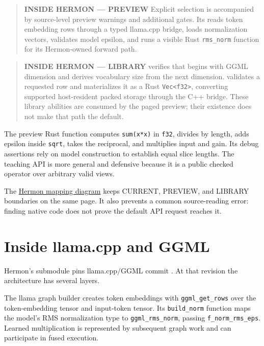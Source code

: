 \begin{quote}
\textbf{INSIDE HERMON --- PREVIEW} Explicit
\texttt{} selection is accompanied
by source-level preview warnings and additional gates. Its
\texttt{} reads token embedding rows through
a typed llama.cpp bridge, loads normalization vectors, validates model
epsilon, and runs a visible Rust \texttt{rms\_norm} function for its
Hermon-owned forward path.
\end{quote}

\begin{quote}
\textbf{INSIDE HERMON --- LIBRARY}
\texttt{} verifies that
\texttt{} begins with GGML dimension
\texttt{} and derives vocabulary size from
the next dimension.
\texttt{} validates a
requested row and materializes it as a Rust
\texttt{Vec\textless{}f32\textgreater{}}, converting supported
host-resident packed storage through the C++ bridge. These library
abilities are consumed by the paged preview; their existence does not
make that path the default.
\end{quote}

The preview Rust function computes \texttt{sum(x*x)} in \texttt{f32},
divides by length, adds epsilon inside \texttt{sqrt}, takes the
reciprocal, and multiplies input and gain. Its debug assertions rely on
model construction to establish equal slice lengths. The teaching API is
more general and defensive because it is a public checked operator over
arbitrary valid views.

The
\href{https://github.com/hermonai/inside-the-llm-engine/blob/astra-visual-rewrite/diagrams/transformer/hermon-llamacpp-normalization-path.txt}{Hermon
mapping diagram} keeps CURRENT, PREVIEW, and LIBRARY boundaries on the
same page. It also prevents a common source-reading error: finding
native code does not prove the default API request reaches it.

\section{Inside llama.cpp and
GGML}\label{inside-llama.cpp-and-ggml-1}

Hermon's submodule pins llama.cpp/GGML commit
\texttt{}. At that
revision the architecture has several layers.

The llama graph builder creates token embeddings with
\texttt{ggml\_get\_rows} over the token-embedding tensor and input-token
tensor. Its \texttt{build\_norm} function maps the model's RMS
normalization type to \texttt{ggml\_rms\_norm}, passing
\texttt{f\_norm\_rms\_eps}. Learned multiplication is represented by
subsequent graph work and can participate in fused execution.


